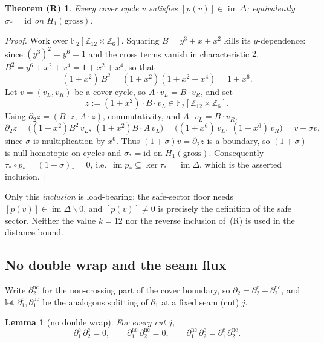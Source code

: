 \documentclass[11pt]{article}
\newcommand{\Z}{\mathbb{Z}}
\newcommand{\F}[1]{\mathbb{F}_{#1}}
\DeclareMathOperator{\img}{im}
\newcommand{\dcut}{\partial_2^{\mathrm{c}}}     %
\newcommand{\dncut}{\partial_2^{\mathrm{nc}}}   %
\newcommand{\cmap}{\Delta}                       %
\theoremstyle{plain}
\newtheorem*{thmR}{Theorem (R)}
\newtheorem{lemma}{Lemma}[section]
\theoremstyle{definition}
\theoremstyle{remark}
\begin{document}
\begin{thmR}
Every cover cycle $v$ satisfies $[p(v)]\in\img\cmap$; equivalently
$\sigma_\ast=\mathrm{id}$ on $H_1(\mathrm{gross})$.
\end{thmR}

\begin{proof}
Work over $\F2[\Z_{12}\times\Z_6]$. Squaring $B=y^3+x+x^2$ kills its
$y$-dependence: since $(y^3)^2=y^6=1$ and the cross terms vanish in characteristic $2$,
$B^2=y^6+x^2+x^4=1+x^2+x^4$, so that
\[
  (1+x^2)\,B^2=(1+x^2)(1+x^2+x^4)=1+x^6 .
\]
Let $v=(v_L,v_R)$ be a cover cycle, so $A\cdot v_L=B\cdot v_R$, and set
\[
  z:=(1+x^2)\cdot B\cdot v_L\in\F2[\Z_{12}\times\Z_6].
\]
Using $\partial_2 z=(B\cdot z,\,A\cdot z)$, commutativity, and $A\cdot v_L=B\cdot v_R$,
\[
  \partial_2 z
  =\bigl((1+x^2)B^2\,v_L,\ (1+x^2)B\!\cdot\!A\,v_L\bigr)
  =\bigl((1+x^6)\,v_L,\ (1+x^6)\,v_R\bigr)
  =v+\sigma v,
\]
since $\sigma$ is multiplication by $x^6$. Thus $(1+\sigma)v=\partial_2 z$ is a
boundary, so $(1+\sigma)$ is null-homotopic on cycles and $\sigma_\ast=\mathrm{id}$
on $H_1(\mathrm{gross})$. Consequently
$\tau_\ast\circ p_\ast=(1+\sigma)_\ast=0$, i.e.\
$\img p_\ast\subseteq\ker\tau_\ast=\img\cmap$, which is the asserted inclusion.
\end{proof}

Only this \emph{inclusion} is load-bearing: the safe-sector floor needs
$[p(v)]\in\img\cmap\smallsetminus 0$, and $[p(v)]\ne 0$ is precisely the definition
of the safe sector. Neither the value $k=12$ nor the reverse inclusion of~(R) is
used in the distance bound.

\subsection{No double wrap and the seam flux}\label{lem:nodoublewrap}

Write $\dncut$ for the non-crossing part of the cover boundary, so
$\partial_2=\dcut+\dncut$, and let $\partial_1^{\mathrm c},\partial_1^{\mathrm{nc}}$
be the analogous splitting of $\partial_1$ at a fixed seam (cut) $j$.

\begin{lemma}[no double wrap]\label{lem:nodoublewrap-statement}
For every cut $j$,
\[
  \partial_1^{\mathrm c}\,\dcut=0,\qquad
  \partial_1^{\mathrm{nc}}\,\dncut=0,\qquad
  \partial_1^{\mathrm{nc}}\,\dcut=\partial_1^{\mathrm c}\,\dncut .
\]
\end{lemma}
\end{document}
